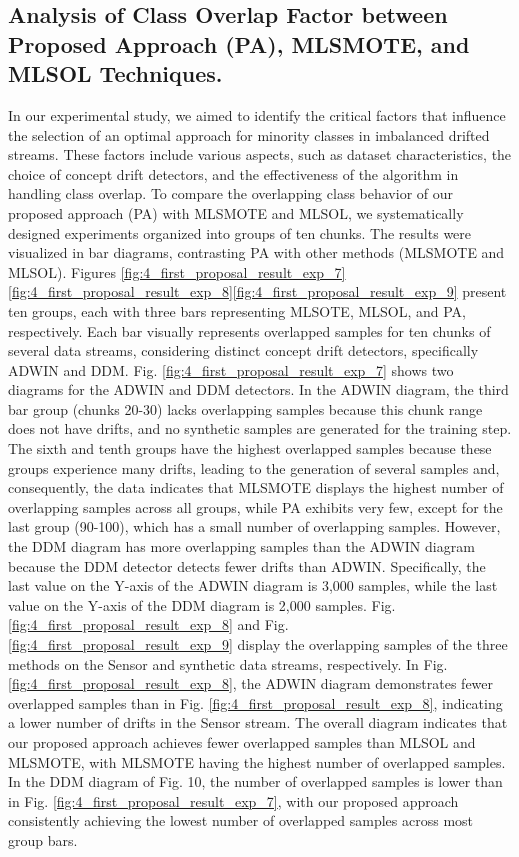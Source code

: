 \subsection{Analysis of Class Overlap Factor between Proposed Approach (PA), MLSMOTE, and MLSOL Techniques.}
In our experimental study, we aimed to identify the critical factors that influence the selection of an optimal approach for minority classes in imbalanced drifted streams. These factors include various aspects, such as dataset characteristics, the choice of concept drift detectors, and the effectiveness of the algorithm in handling class overlap. To compare the overlapping class behavior of our proposed approach (PA) with MLSMOTE and MLSOL, we systematically designed experiments organized into groups of ten chunks. The results were visualized in bar diagrams, contrasting PA with other methods (MLSMOTE and MLSOL). Figures \ref{fig:4_first_proposal_result_exp_7}\ref{fig:4_first_proposal_result_exp_8}\ref{fig:4_first_proposal_result_exp_9} present ten groups, each with three bars representing MLSOTE, MLSOL, and PA, respectively. Each bar visually represents overlapped samples for ten chunks of several data streams, considering distinct concept drift detectors, specifically ADWIN and DDM.
Fig. \ref{fig:4_first_proposal_result_exp_7} shows two diagrams for the ADWIN and DDM detectors. In the ADWIN diagram, the third bar group (chunks 20-30) lacks overlapping samples because this chunk range does not have drifts, and no synthetic samples are generated for the training step. The sixth and tenth groups have the highest overlapped samples because these groups experience many drifts, leading to the generation of several samples and, consequently, the data indicates that MLSMOTE displays the highest number of overlapping samples across all groups, while PA exhibits very few, except for the last group (90-100), which has a small number of overlapping samples. However, the DDM diagram has more overlapping samples than the ADWIN diagram because the DDM detector detects fewer drifts than ADWIN. Specifically, the last value on the Y-axis of the ADWIN diagram is 3,000 samples, while the last value on the Y-axis of the DDM diagram is 2,000 samples. Fig. \ref{fig:4_first_proposal_result_exp_8} and Fig. \ref{fig:4_first_proposal_result_exp_9} display the overlapping samples of the three methods on the Sensor and synthetic data streams, respectively. In Fig. \ref{fig:4_first_proposal_result_exp_8}, the ADWIN diagram demonstrates fewer overlapped samples than in Fig. \ref{fig:4_first_proposal_result_exp_8}, indicating a lower number of drifts in the Sensor stream. The overall diagram indicates that our proposed approach achieves fewer overlapped samples than MLSOL and MLSMOTE, with MLSMOTE having the highest number of overlapped samples. In the DDM diagram of Fig. 10, the number of overlapped samples is lower than in Fig. \ref{fig:4_first_proposal_result_exp_7}, with our proposed approach consistently achieving the lowest number of overlapped samples across most group bars.
